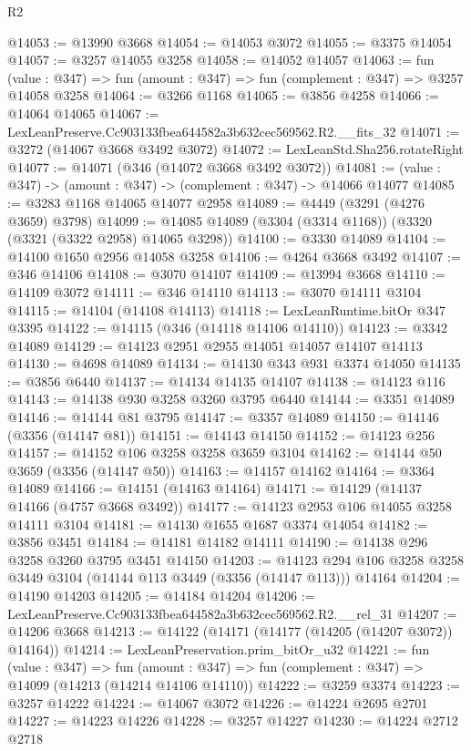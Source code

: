 \begin{lexlean}{R2}
\begin{coremodule}
@14053 := @13990 @3668
@14054 := @14053 @3072
@14055 := @3375 @14054
@14057 := @3257 @14055 @3258
@14058 := @14052 @14057
@14063 := fun (value : @347) => fun (amount : @347) => fun (complement : @347) => @3257 @14058 @3258
@14064 := @3266 @1168
@14065 := @3856 @4258
@14066 := @14064 @14065
@14067 := LexLeanPreserve.Cc903133fbea644582a3b632cec569562.R2.__fits_32
@14071 := @3272 (@14067 @3668 @3492 @3072)
@14072 := LexLeanStd.Sha256.rotateRight
@14077 := @14071 (@346 (@14072 @3668 @3492 @3072))
@14081 := (value : @347) -> (amount : @347) -> (complement : @347) -> @14066 @14077
@14085 := @3283 @1168 @14065 @14077 @2958
@14089 := @4449 (@3291 (@4276 @3659) @3798)
@14099 := @14085 @14089 (@3304 (@3314 @1168)) (@3320 (@3321 (@3322 @2958) @14065 @3298))
@14100 := @3330 @14089
@14104 := @14100 @1650 @2956 @14058 @3258
@14106 := @4264 @3668 @3492
@14107 := @346 @14106
@14108 := @3070 @14107
@14109 := @13994 @3668
@14110 := @14109 @3072
@14111 := @346 @14110
@14113 := @3070 @14111 @3104
@14115 := @14104 (@14108 @14113)
@14118 := LexLeanRuntime.bitOr @347 @3395
@14122 := @14115 (@346 (@14118 @14106 @14110))
@14123 := @3342 @14089
@14129 := @14123 @2951 @2955 @14051 @14057 @14107 @14113
@14130 := @4698 @14089
@14134 := @14130 @343 @931 @3374 @14050
@14135 := @3856 @6440
@14137 := @14134 @14135 @14107
@14138 := @14123 @116
@14143 := @14138 @930 @3258 @3260 @3795 @6440
@14144 := @3351 @14089
@14146 := @14144 @81 @3795
@14147 := @3357 @14089
@14150 := @14146 (@3356 (@14147 @81))
@14151 := @14143 @14150
@14152 := @14123 @256
@14157 := @14152 @106 @3258 @3258 @3659 @3104
@14162 := @14144 @50 @3659 (@3356 (@14147 @50))
@14163 := @14157 @14162
@14164 := @3364 @14089
@14166 := @14151 (@14163 @14164)
@14171 := @14129 (@14137 @14166 (@4757 @3668 @3492))
@14177 := @14123 @2953 @106 @14055 @3258 @14111 @3104
@14181 := @14130 @1655 @1687 @3374 @14054
@14182 := @3856 @3451
@14184 := @14181 @14182 @14111
@14190 := @14138 @296 @3258 @3260 @3795 @3451 @14150
@14203 := @14123 @294 @106 @3258 @3258 @3449 @3104 (@14144 @113 @3449 (@3356 (@14147 @113))) @14164
@14204 := @14190 @14203
@14205 := @14184 @14204
@14206 := LexLeanPreserve.Cc903133fbea644582a3b632cec569562.R2.__rel_31
@14207 := @14206 @3668
@14213 := @14122 (@14171 (@14177 (@14205 (@14207 @3072)) @14164))
@14214 := LexLeanPreservation.prim_bitOr_u32
@14221 := fun (value : @347) =>
  fun (amount : @347) => fun (complement : @347) => @14099 (@14213 (@14214 @14106 @14110))
@14222 := @3259 @3374
@14223 := @3257 @14222
@14224 := @14067 @3072
@14226 := @14224 @2695 @2701
@14227 := @14223 @14226
@14228 := @3257 @14227
@14230 := @14224 @2712 @2718

\end{coremodule}
\end{lexlean}
